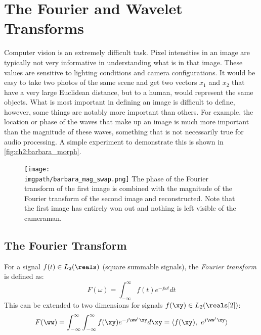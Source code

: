 \section{The Fourier and Wavelet Transforms}\label{sec:ch2:fourier}

  Computer vision is an extremely difficult task. Pixel intensities in an image are
  typically not very informative in understanding what is in that image.
  These values are sensitive to lighting conditions and camera configurations.
  It would be easy to take two photos of the same scene and get two vectors
  $x_1$ and $x_2$ that have a very large Euclidean distance, but to a human,
  would represent the same objects. What is most important in defining an image is
  difficult to define, however, some things are notably more important than
  others. For example, the location or phase of the waves that make up an
  image is much more important than the magnitude of these waves, something
  that is not necessarily true for audio processing. A simple experiment to
  demonstrate this is shown in \autoref{fig:ch2:barbara_morph}.
  \begin{figure}
    \centering
      \texttt{[image: \\imgpath/barbara\_mag\_swap.png]}
        {The phase of the Fourier transform of the first image is combined with
        the magnitude of the Fourier transform of the second image and
        reconstructed. Note that the first image has entirely won out and
        nothing is left visible of the cameraman.}
      \label{fig:ch2:barbara_morph}
  \end{figure}

\subsection{The Fourier Transform}
For a signal $f(t) \in L_2(\reals)$ (square summable signals), the \emph{Fourier
transform} is defined as:
\begin{equation}
  F(\omega) = \int_{-\infty}^{\infty} f(t) e^{-j\omega t} dt
\end{equation}
This can be extended to two dimensions for signals $f(\xy) \in L_2(\reals[2])$:
\begin{equation}
  F(\ww) = \int_{-\infty}^{\infty}\int_{-\infty}^{\infty} f(\xy) e^{-j\ww^t \xy} d\xy = \langle f(\xy),\ e^{j\ww^t \xy} \rangle
\end{equation}

